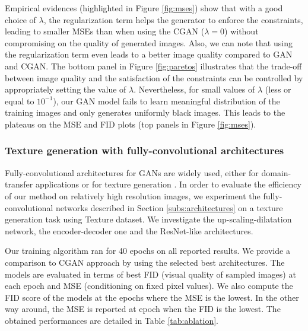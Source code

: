 Empirical evidences (highlighted in Figure \ref{fig:mses}) show that with a good choice of $\lambda$, the regularization term helps the generator to enforce the constraints, leading to smaller \ac{MSE}s than when using the \ac{CGAN} ($\lambda=0$) without compromising on the quality of generated images. Also, we can note that using the regularization term even leads to a better image quality compared to \ac{GAN} and \ac{CGAN}.
%
The bottom panel in Figure \ref{fig:paretos} illustrates that the trade-off between image quality and the satisfaction of the constraints can be controlled by appropriately setting the value of $\lambda$. Nevertheless, for small values of $\lambda$ (less or equal to $10^{-1}$), our GAN model fails to learn meaningful distribution of the training images and only generates uniformly black images. This leads to the plateaus on the \ac{MSE} and \ac{FID} plots (top panels in Figure \ref{fig:mses}).




\subsubsection{Texture generation with fully-convolutional architectures}
\label{sub:fcnn}
Fully-convolutional architectures for GANs are widely used, either for domain-transfer applications \citep{Zhu2017, Isola2016} or for texture generation \citep{Jetchev2017}. In order to evaluate the efficiency of our method on relatively high resolution images, we experiment the fully-convolutional networks described in Section \ref{subs:architectures} on a texture generation task using Texture dataset. We investigate the up-scaling-dilatation network, the encoder-decoder one and the ResNet-like architectures.

Our training algorithm ran for 40 epochs on all reported results. We provide a comparison to CGAN \citep{Mirza2014} approach by using the selected best architectures.
The models are evaluated in terms of best FID (visual quality of sampled images) at each epoch and MSE (conditioning on fixed pixel values).  We also compute the FID score of the models at the epochs where the MSE is the lowest. In the other way around, the MSE is reported at epoch when the FID is the lowest. The obtained performances are detailed in Table \ref{tab:ablation}.

